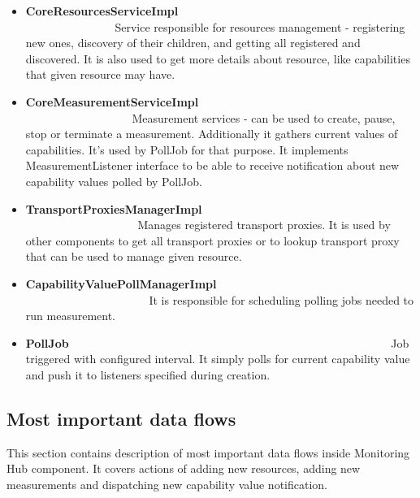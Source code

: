 \begin{itemize}
\item {\bf CoreResourcesServiceImpl}~~~~~~~~~~~~~~~~~~~~~~~~~~~~~~~~~~~~~~~~~~~~~~~~~~~~~~~~\linebreak
Service responsible for resources management - registering new ones, discovery of their children, and getting all registered and discovered. It is also used to get more details about resource, like capabilities that given resource may have.

\item {\bf CoreMeasurementServiceImpl}~~~~~~~~~~~~~~~~~~~~~~~~~~~~~~~~~~~~~~~~~~~~~~~~~~~~~~~~\linebreak
Measurement services - can be used to create, pause, stop or terminate a measurement. Additionally it gathers current values of capabilities. It's used by PollJob for that purpose. It implements MeasurementListener interface to be able to receive notification about new capability values polled by PollJob. 

\item {\bf TransportProxiesManagerImpl}~~~~~~~~~~~~~~~~~~~~~~~~~~~~~~~~~~~~~~~~~~~~~~~~~~~~~~~~\linebreak
Manages registered transport proxies. It is used by other components to get all transport proxies or to lookup transport proxy that can be used to manage given resource.

\item {\bf CapabilityValuePollManagerImpl}~~~~~~~~~~~~~~~~~~~~~~~~~~~~~~~~~~~~~~~~~~~~~~~~~~~~~~~~\linebreak
It is responsible for scheduling polling jobs needed to run measurement.

\item {\bf PollJob}~~~~~~~~~~~~~~~~~~~~~~~~~~~~~~~~~~~~~~~~~~~~~~~~~~~~~~~~\linebreak
Job triggered with configured interval. It simply polls for current capability value and push it to listeners specified during creation.

\end{itemize}

\pagebreak

\subsection{Most important data flows}

This section contains description of most important data flows inside Monitoring Hub component. It covers actions of adding new resources, adding new measurements and dispatching new capability value notification.

